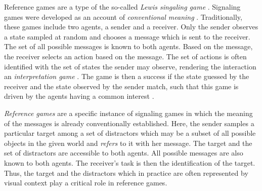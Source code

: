 Reference games are a type of the so-called \textit{Lewis singaling game} \parencite{lewis1969convention, skyrms2010signals}.
Signaling games were developed as an account of \textit{conventional meaning} \parencite{grice1975logic}. Traditionally, these games include two agents, a sender and a receiver. Only the sender observes a state sampled at random and chooses a message which is sent to the receiver. The set of all possible messages is known to both agents. Based on the message, the receiver selects an action based on the message. The set of actions is often identified with the set of states the sender may observe, rendering the interaction an \emph{interpretation game} \parencite{franke2016reasoning}. The game is then a success if the state guessed by the receiver and the state observed by the sender match, such that this game is driven by the agents having a common interest \parencite{lewis1969convention} \parencite[although see][for a relaxation of this assumption]{jager2014rationalizable}. 

\textit{Reference games} are a specific instance of signaling games in which the meaning of the messages is already conventionally established. Here, the sender samples a particular target among a set of distractors which may be a subset of all possible objects in the given world and \textit{refers} to it with her message. The target and the set of distractors are accessible to both agents. All possible messages are also known to both agents. The receiver's task is then the identification of the target. Thus, the target and the distractors which in practice are often represented by visual context play a critical role in reference games.


